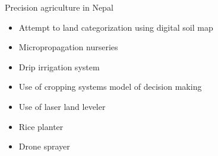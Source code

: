 \documentclass[11pt,dvipsnames,ignorenonframetext,aspectratio=169]{beamer}
\providecommand{\tightlist}{%
  \setlength{\itemsep}{0pt}\setlength{\parskip}{0pt}}
\begin{document}
\begin{frame}{Precision agriculture in Nepal}
\protect\hypertarget{precision-agriculture-in-nepal}{}
\begin{itemize}
\tightlist
\item
  Attempt to land categorization using digital soil map
\item
  Micropropagation nurseries
\item
  Drip irrigation system
\item
  Use of cropping systems model of decision making
\item
  Use of laser land leveler
\item
  Rice planter
\item
  Drone sprayer
\end{itemize}
\end{frame}
\end{document}
